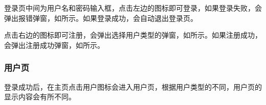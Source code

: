 \documentclass[lang=cn,11pt,a4paper,cite=authornum]{paper}
\begin{document}
登录页中间为用户名和密码输入框，点击左边的图标即可登录，如果登录失败，会弹出报错弹窗，如所示。如果登录成功，会自动退出登录页。

点击右边的图标即可注册，会弹出选择用户类型的弹窗，如所示。如果注册成功，会弹出注册成功弹窗，如所示。

\subsubsection{用户页}

登录成功后，在主页点击用户图标会进入用户页，根据用户类型的不同，用户页的显示内容会有所不同。

\begin{figure}[htbp]

    \centering


\end{figure}
\end{document}
